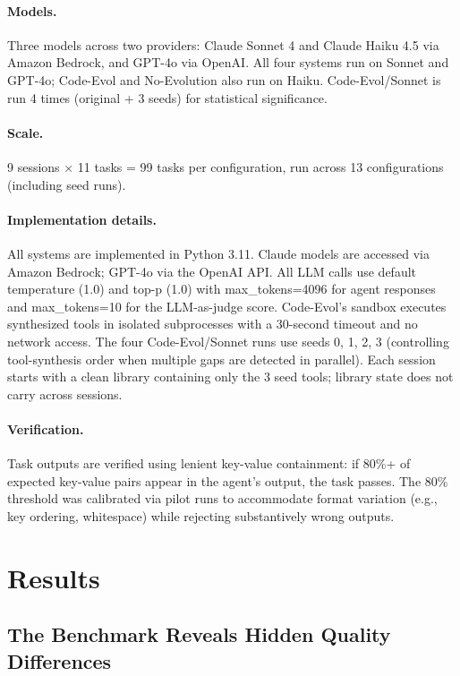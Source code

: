 \documentclass[sigplan,review,anonymous]{acmart}
\begin{document}
\paragraph{Models.} Three models across two providers: Claude Sonnet 4 and Claude Haiku 4.5 via Amazon Bedrock, and GPT-4o via OpenAI. All four systems run on Sonnet and GPT-4o; Code-Evol and No-Evolution also run on Haiku. Code-Evol/Sonnet is run 4 times (original + 3 seeds) for statistical significance.

\paragraph{Scale.} 9 sessions $\times$ 11 tasks = 99 tasks per configuration, run across 13 configurations (including seed runs).

\paragraph{Implementation details.} All systems are implemented in Python 3.11. Claude models are accessed via Amazon Bedrock; GPT-4o via the OpenAI API. All LLM calls use default temperature (1.0) and top-p (1.0) with max\_tokens=4096 for agent responses and max\_tokens=10 for the LLM-as-judge score. Code-Evol's sandbox executes synthesized tools in isolated subprocesses with a 30-second timeout and no network access. The four Code-Evol/Sonnet runs use seeds 0, 1, 2, 3 (controlling tool-synthesis order when multiple gaps are detected in parallel). Each session starts with a clean library containing only the 3 seed tools; library state does not carry across sessions.

\paragraph{Verification.} Task outputs are verified using lenient key-value containment: if 80\%+ of expected key-value pairs appear in the agent's output, the task passes. The 80\% threshold was calibrated via pilot runs to accommodate format variation (e.g., key ordering, whitespace) while rejecting substantively wrong outputs.

\section{Results}

\subsection{The Benchmark Reveals Hidden Quality Differences}
\end{document}
